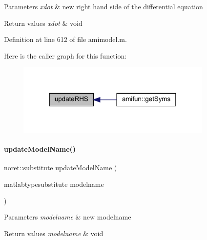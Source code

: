 \begin{DoxyParams}{Parameters}
{\em xdot} & new right hand side of the differential equation\\
\hline
\end{DoxyParams}

\begin{DoxyRetVals}{Return values}
{\em xdot} & void \\
\hline
\end{DoxyRetVals}


Definition at line 612 of file amimodel.\+m.

Here is the caller graph for this function\+:
\nopagebreak
\begin{figure}[H]
\begin{center}
\leavevmode
\includegraphics[width=274pt]{classamimodel_aa508c0cd4ac026e464f85cec25678850_icgraph}
\end{center}
\end{figure}
\mbox{\label{classamimodel_a5692662c7851369abd5ca0e51295f33a}} 
\paragraph{\texorpdfstring{update\+Model\+Name()}{updateModelName()}}
{\footnotesize\ttfamily noret\+::substitute update\+Model\+Name (\begin{DoxyParamCaption}\item[{matlabtypesubstitute}]{modelname }\end{DoxyParamCaption})}


\begin{DoxyParams}{Parameters}
{\em modelname} & new modelname\\
\hline
\end{DoxyParams}

\begin{DoxyRetVals}{Return values}
{\em modelname} & void \\
\hline
\end{DoxyRetVals}


